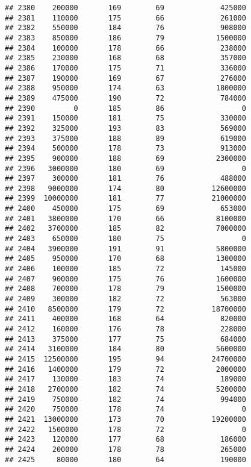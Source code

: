 \documentclass[
]{article}
\begin{document}
\begin{verbatim}
## 2380    200000       169        69             425000
## 2381    110000       175        66             261000
## 2382    550000       184        76             908000
## 2383    850000       186        79            1500000
## 2384    100000       178        66             238000
## 2385    230000       168        68             357000
## 2386    170000       175        71             336000
## 2387    190000       169        67             276000
## 2388    950000       174        63            1800000
## 2389    475000       190        72             784000
## 2390         0       185        86                  0
## 2391    150000       181        75             330000
## 2392    325000       193        83             569000
## 2393    375000       188        89             619000
## 2394    500000       178        73             913000
## 2395    900000       188        69            2300000
## 2396   3000000       180        69                  0
## 2397    300000       181        76             488000
## 2398   9000000       174        80           12600000
## 2399  10000000       181        77           21000000
## 2400    450000       175        69             653000
## 2401   3800000       170        66            8100000
## 2402   3700000       185        82            7000000
## 2403    650000       180        75                  0
## 2404   3900000       191        91            5800000
## 2405    950000       170        68            1300000
## 2406    100000       185        72             145000
## 2407    900000       175        76            1600000
## 2408    700000       178        79            1500000
## 2409    300000       182        72             563000
## 2410   8500000       179        72           18700000
## 2411    400000       168        64             820000
## 2412    160000       176        78             228000
## 2413    375000       177        75             684000
## 2414   3100000       184        80            5600000
## 2415  12500000       195        94           24700000
## 2416   1400000       179        72            2000000
## 2417    130000       183        74             189000
## 2418   2700000       182        74            5200000
## 2419    750000       182        74             994000
## 2420    750000       178        74                  0
## 2421  13000000       173        70           19200000
## 2422   1500000       178        72                  0
## 2423    120000       177        68             186000
## 2424    200000       178        78             265000
## 2425     80000       180        64             190000

\end{verbatim}
\end{document}
